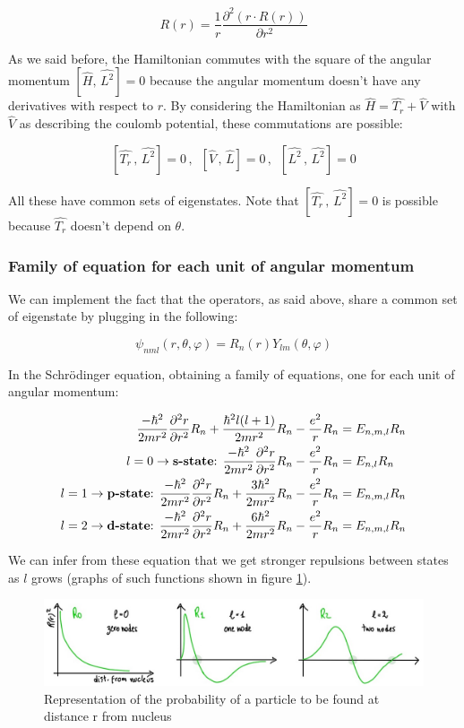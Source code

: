 		$$R(r)=\frac{1}{r}\frac{\partial^2(r\cdot R(r))}{\partial r^2}$$

		As we said before, the Hamiltonian commutes with the square of the angular momentum $[\hat{H},\,\hat{L^2}]=0$ because the angular momentum doesn't have any derivatives with respect to $r$.
		By considering the Hamiltonian as $\hat{H}=\hat{T_r}+\hat{V}$ with $\hat{V}$ as describing the coulomb potential, these commutations are possible:

		$$[\hat{T_r}\,,\,\hat{L^2}]=0\,,\,\,\,[\hat{V}\,,\,\hat{L}]=0\,,\,\,\,[\hat{L^2}\,,\,\hat{L^2}]=0$$

		All these have common sets of eigenstates.
		Note that $[\hat{T_r}\,,\,\hat{L^2}]=0$ is possible because $\hat{T_r}$ doesn't depend on $\theta$.

		\subsubsection{Family of equation for each unit of angular momentum}
		We can implement the fact that the operators, as said above, share a common set of eigenstate by plugging in the following:

		$$\psi_{nml}(r, \theta, \varphi) = R_n(r)Y_{lm}(\theta, \varphi)$$

		In the Schr\"odinger equation, obtaining a family of equations, one for each unit of angular momentum:

		\begin{align*}
			\frac{-\hbar^2}{2mr^2}\frac{\partial^2r}{\partial r^2}R_n+\frac{\hbar^2l(l+1)}{2mr^2}R_n-\frac{e^2}{r}R_n&=E_{n,m,l}R_n\\
			l=0 \rightarrow \text{\textbf{s-state}: } \frac{-\hbar^2}{2mr^2}\frac{\partial^2r}{\partial r^2}R_n-\frac{e^2}{r}R_n&=E_{n,l}R_n\\
			l=1 \rightarrow \text{\textbf{p-state}: }\frac{-\hbar^2}{2mr^2}\frac{\partial^2r}{\partial r^2}R_n+\frac{3\hbar^2}{2mr^2}R_n-\frac{e^2}{r}R_n&=E_{n,m,l}R_n\\
			l=2 \rightarrow \text{\textbf{d-state}: }\frac{-\hbar^2}{2mr^2}\frac{\partial^2r}{\partial r^2}R_n+\frac{6\hbar^2}{2mr^2}R_n-\frac{e^2}{r}R_n&=E_{n,m,l}R_n
		\end{align*}

		We can infer from these equation that we get stronger repulsions between states as $l$ grows (graphs of such functions shown in figure \ref{fig_swaves}).

		\begin{figure}[htbp!]
 			\centering
 			\includegraphics[scale=0.30]{Ta-1}
 			\caption{Representation of the probability of a particle to be found at distance r from nucleus}
 			\label{fig_swaves}
		\end{figure}

